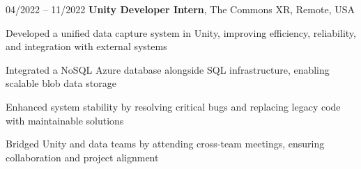 \begin{twocolentry}{
    04/2022 – 11/2022
}
\textbf{Unity Developer Intern}, The Commons XR, Remote, USA\end{twocolentry}

\vspace{0.10 cm}
\begin{onecolentry}
   \begin{highlights}
       \item Developed a unified data capture system in Unity, improving efficiency, reliability, and integration with external systems  
       \item Integrated a NoSQL Azure database alongside SQL infrastructure, enabling scalable blob data storage
       \item Enhanced system stability by resolving critical bugs and replacing legacy code with maintainable solutions
       \item Bridged Unity and data teams by attending cross-team meetings, ensuring collaboration and project alignment
   \end{highlights}
\end{onecolentry}